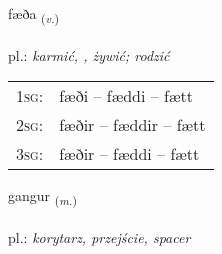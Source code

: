 \documentclass[frontgrid, backgrid]{flacards}\usepackage[]{graphicx}\usepackage[]{xcolor}
\begin{document}
\renewcommand{\flhead}{\vskip5pt \fboxsep=0pt {\small\bfseries\footnotesize Sagnorð | czasownik}}
\renewcommand{\fcfoot}{\vskip5pt \fboxsep=0pt \hspace{2pt}{\small\bfseries\footnotesize 1K}}

\renewcommand{\blhead}{\vskip5pt {\small\bfseries\footnotesize Sagnorð | czasownik }}
\renewcommand{\bcfoot}{\vskip5pt \hspace{2pt}{\small\bfseries\footnotesize 1K}}


{fæða \small{\textsubscript{(\textit{v.})}} \\[1ex] %
\textphonetic{[faiːða]} \\
pl.: \emph{karmić, , żywić; rodzić} \\  [2ex]
\renewcommand*{\arraystretch}{0.8}
\begin{tabular}{p{1cm}l}
\textsc{1sg}: & fæði -- fæddi -- fætt \\ 
\textsc{2sg}: & fæðir -- fæddir -- fætt \\ 
\textsc{3sg}: & fæðir -- fæddi -- fætt \\ 
\end{tabular}
}

\renewcommand{\flhead}{\vskip5pt \fboxsep=0pt {\small\bfseries\footnotesize Nafnorð | rzeczownik}}
\renewcommand{\fcfoot}{\vskip5pt \fboxsep=0pt \hspace{2pt}{\small\bfseries\footnotesize 1K}}

\renewcommand{\blhead}{\vskip5pt {\small\bfseries\footnotesize Nafnorð | rzeczownik }}
\renewcommand{\bcfoot}{\vskip5pt \hspace{2pt}{\small\bfseries\footnotesize 1K}}


{gangur \small{\textsubscript{(\textit{m.})}} \\[1ex] %
\textphonetic{[kauŋkʏr]} \\
pl.: \emph{korytarz, przejście, spacer} \\  [2ex]
\renewcommand*{\arraystretch}{0.8}
}
\end{document}
